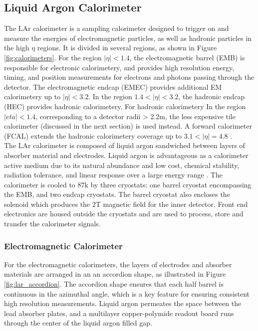 \subsection{Liquid Argon Calorimeter}
\label{sec:lar}
The LAr calorimeter is a sampling calorimeter designed to trigger on and measure the energies of electromagnetic particles, as well as hadronic particles in the high $\eta$ regions. It is divided in several regions, as shown in Figure \ref{fig:calorimeters}. For the region $|\eta| < 1.4$, the electromagnetic barrel (EMB) is responsible for electronic calorimetery, and provides high resolution energy, timing, and position measurements for electrons and photons passing through the detector. The electromagnetic endcap (EMEC) provides additional EM calorimetery up to $|\eta|<3.2$. In the region $1.4 < |\eta| < 3.2$, the hadronic endcap (HEC) provides hadronic calorimetery. For hadronic calorimetery In the region $|eta| < 1.4$, corresponding to a detector radii > 2.2m, the less expensive tile calorimeter (discussed in the next section) is used instead. A forward calorimeter (FCAL) extends the hadronic calorimetery coverage up to $3.1 < |\eta| = 4.8$ \cite{lar_tdr}. \\
 
The LAr calorimeter is composed of liquid argon sandwiched between layers of absorber material and electrodes. Liquid argon is advantageous as a calorimeter active medium due to its natural abundance and low cost, chemical stability, radiation tolerance, and linear response over a large energy range \cite{lar_ssc}. The calorimeter is cooled to 87k by three cryostats: one barrel cryostat encompassing the EMB, and two endcap cryostats. The barrel cryostat also encloses the solenoid which produces the 2T magnetic field for the inner detector. Front end electronics are housed outside the cryostats and are used to process, store and transfer the calorimeter signals. \\ 

\subsubsection{Electromagnetic Calorimeter}
For the electromagnetic calorimeters, the layers of electrodes and absorber materials are arranged in an an accordion shape, as illustrated in Figure \ref{fig:lar_accordion}. The accordion shape ensures that each half barrel is continuous in the azimuthal angle, which is a key feature for ensuring consistent high resolution measurements. Liquid argon permeates the space between the lead absorber plates, and a multilayer copper-polymide readout board runs through the center of the liquid argon filled gap. \\

